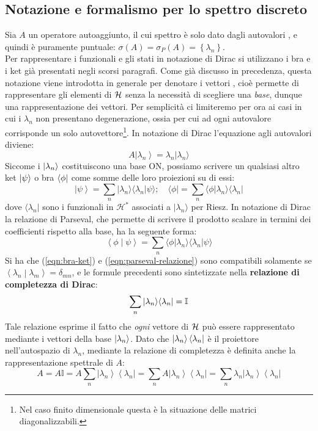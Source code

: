 \documentclass[../../FisicaTeorica.tex]{subfiles}
\begin{document}
\subsection{Notazione e formalismo per lo spettro discreto}
Sia $A$ un operatore autoaggiunto, il cui spettro è solo dato dagli autovalori , e quindi è puramente puntuale: $\sigma \left(A\right)= \sigma_P\left(A\right)= \left\{\lambda_n\right\}$.\\
Per rappresentare i funzionali e gli stati in notazione di Dirac si utilizzano i bra e i ket già presentati negli scorsi paragrafi.
Come già discusso in precedenza, questa notazione viene introdotta in generale per denotare i vettori , cioè permette di rappresentare gli elementi di $\mathcal{H}$ senza la necessità di scegliere una \emph{base}, dunque una rappresentazione  dei vettori.
Per semplicità ci limiteremo per ora ai casi in cui i $\lambda_n$ non presentano degenerazione, ossia per cui ad ogni autovalore corrisponde un solo autovettore\footnote{Nel caso finito dimensionale questa è la situazione delle matrici diagonalizzabili.}.
In notazione di Dirac l'equazione agli autovalori diviene:
\[
A \left|\lambda_n\right\rangle=\lambda_n|\lambda_n \rangle 
\]
Siccome i $\Ket{\lambda_n}$ costituiscono una base ON, possiamo scrivere un qualsiasi altro ket $\Ket{\psi}$ o bra $\Bra{\phi}$ come somme delle loro proiezioni su di essi:
\begin{equation}
\left|\psi\right\rangle=\sum_{n}{|\lambda_n\rangle \langle\lambda_n|\psi\rangle }; \quad 
\langle \phi |=\sum_{n}{\langle\phi|\lambda_n\rangle \langle\lambda_n|}
\label{eqn:bra-ket}
\end{equation}
dove $\langle \lambda_n|$ sono i funzionali in $\mathcal{H}^\ast$ associati a $|\lambda_n \rangle$  per Riesz. In notazione di Dirac la relazione di Parseval, che permette di scrivere il prodotto scalare in termini dei coefficienti rispetto alla base, ha la seguente forma:
\begin{equation}
\left\langle\phi\middle|\psi\right\rangle=\sum_{n}{\langle\phi|\lambda_n\rangle \langle\lambda_n|\psi\rangle }
\label{eqn:parseval-relazione}
\end{equation}
Si ha che (\ref{eqn:bra-ket}) e (\ref{eqn:parseval-relazione}) sono compatibili solamente se $\left\langle\lambda_n\middle|\lambda_m\right\rangle=\delta_{mn}$, e le formule precedenti sono sintetizzate nella \textbf{relazione di completezza di Dirac}:
\[
\sum_{n}{|\lambda_n\rangle \langle\lambda_n|}=\mathbb{I}
\]
Tale relazione esprime il fatto che \emph{ogni} vettore di $\mathcal{H}$ può essere rappresentato mediante i vettori della base $\Ket{\lambda_n}$.
Dato che $\Ket{\lambda_n} \Bra{\lambda_n}$ è il proiettore nell'autospazio di $\lambda_n$, mediante la relazione di completezza è definita anche la rappresentazione spettrale di $A$:
\[
A = A \mathbb I = A\sum_{n}{\left|\lambda_n\right\rangle\left\langle\lambda_n\right|} = \sum_{n}{A \left|\lambda_n\right\rangle\left\langle\lambda_n\right| = \sum_{n}{\lambda_n\left|\lambda_n\right\rangle\left\langle\lambda_n\right|}}
\]
\end{document}
